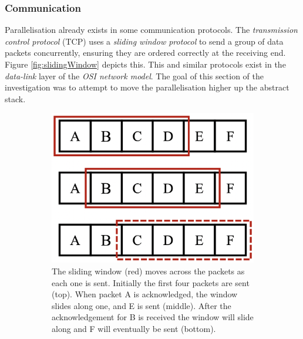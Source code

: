 \subsubsection{Communication}
\label{sec:communication}
\setlength{\leftskip}{0.5cm}
\indent \indent
Parallelisation already exists in some communication protocols. The \textit{transmission control protocol} (TCP) uses a \textit{sliding window protocol} to send a group of data packets concurrently, ensuring they are ordered correctly at the receiving end. Figure \ref{fig:slidingWindow} depicts this. This and similar protocols exist in the \textit{data-link} layer of the \textit{OSI network model}. The goal of this section of the investigation was to attempt to move the parallelisation higher up the abstract stack.
\begin{figure}[htp]
    \begin{subfigure}[b]{0.45\textwidth}
        \centering
        \includegraphics[scale=0.3]{figures/slidingWindow1}
        \caption{The sliding window (red) moves across the packets as each one is sent. Initially the first four packets are sent (top). When packet A is acknowledged, the window slides along one, and E is sent (middle). After the acknowledgement for B is received the window will slide along and F will eventually be sent (bottom).}
    \end{subfigure}\hfill%
    \begin{subfigure}[b]{0.45\textwidth}
        \centering

\end{subfigure}
\end{figure}
